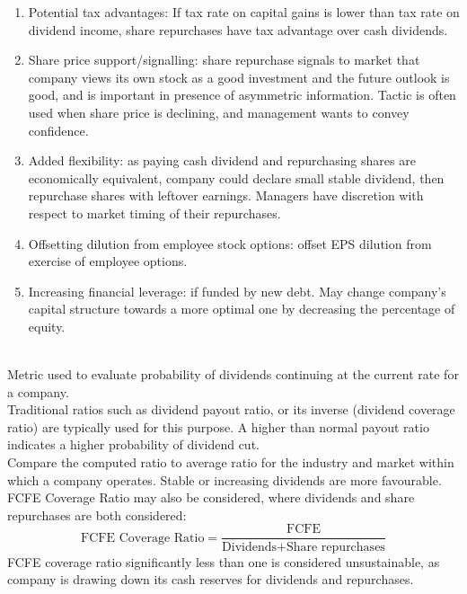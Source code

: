 \begin{remark} 
\begin{enumerate}[label=\roman*.]
\setlength{\itemsep}{0pt}
\item Potential tax advantages: If tax rate on capital gains is lower than tax rate on dividend income, share repurchases have tax advantage over cash dividends.
\item Share price support/signalling: share repurchase signals to market that company views its own stock as a good investment and the future outlook is good, and is important in presence of asymmetric information. Tactic is often used when share price is declining, and management wants to convey confidence.
\item Added flexibility: as paying cash dividend and repurchasing shares are economically equivalent, company could declare small stable dividend, then repurchase shares with leftover earnings. Managers have discretion with respect to market timing of their repurchases.
\item Offsetting dilution from employee stock options: offset EPS dilution from exercise of employee options.
\item Increasing financial leverage: if funded by new debt. May change company's capital structure towards a more optimal one by decreasing the percentage of equity.
\end{enumerate}
\end{remark}

\begin{remark} \\
Metric used to evaluate probability of dividends continuing at the current rate for a company.\\
Traditional ratios such as dividend payout ratio, or its inverse (dividend coverage ratio) are typically used for this purpose. A higher than normal payout ratio indicates a higher probability of dividend cut.\\
Compare the computed ratio to average ratio for the industry and market within which a company operates. Stable or increasing dividends are more favourable.\\
FCFE Coverage Ratio may also be considered, where dividends and share repurchases are both considered:
\begin{equation}
\text{FCFE Coverage Ratio} = \frac{\text{FCFE}}{\text{Dividends} + \text{Share repurchases}} \nonumber
\end{equation}
FCFE coverage ratio significantly less than one is considered unsustainable, as company is drawing down its cash reserves for dividends and repurchases.
\end{remark}
